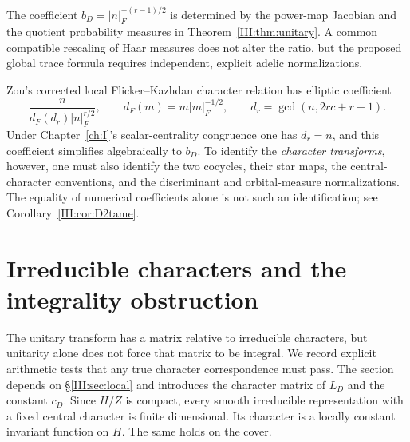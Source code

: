 \begin{remark}\label{III:rem:normalizations}
The coefficient $b_D=|n|_F^{-(r-1)/2}$ is determined by the
power-map Jacobian and the quotient probability measures in
Theorem~\ref{III:thm:unitary}. A common compatible rescaling of Haar
measures does not alter the ratio, but the proposed global trace
formula requires independent, explicit adelic normalizations.

Zou's corrected local Flicker--Kazhdan character relation
\cite[(3.2) and Remark~3.3]{Zo23} has elliptic coefficient
\[
  \frac{n}{d_F(d_r)|n|_F^{r/2}},\qquad
  d_F(m)=m|m|_F^{-1/2},\qquad
  d_r=\gcd(n,2rc+r-1).
\]
Under Chapter~\ref{ch:I}'s scalar-centrality congruence one has $d_r=n$, and
this coefficient simplifies algebraically to $b_D$.
To identify the \emph{character transforms}, however, one must also
identify the two cocycles, their star maps, the central-character
conventions, and the discriminant and orbital-measure normalizations.
The equality of numerical coefficients alone is not such an
identification; see Corollary~\ref{III:cor:D2tame}.
\end{remark}

\section{Irreducible characters and the integrality obstruction}\label{III:sec:characters}
The unitary transform has a matrix relative to irreducible characters,
but unitarity alone does not force that matrix to be integral.
We record explicit arithmetic tests that any true character
correspondence must pass. The section depends on \S\ref{III:sec:local} and introduces the character matrix of $L_D$ and the constant $c_D$.
Since $H/Z$ is compact, every smooth irreducible representation with a fixed central character is finite dimensional. Its character is a locally constant invariant function on $H$. The same holds on the cover.


